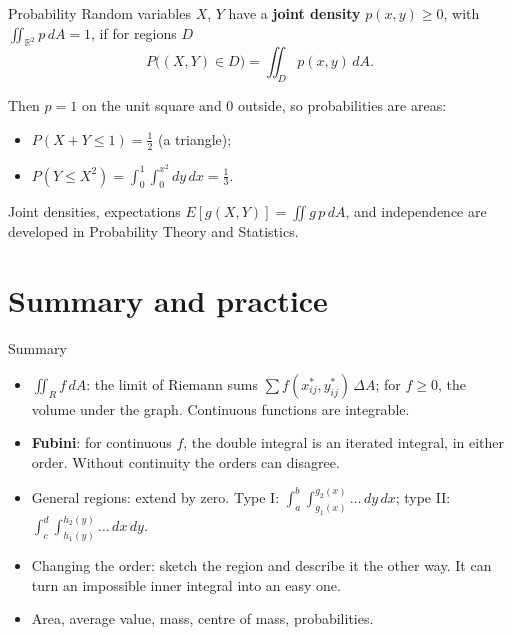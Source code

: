 \documentclass[10pt]{wosm-slides}
\newcommand{\R}{\mathbb{R}}
\newcommand{\dA}{\, dA}
\begin{document}
\begin{frame}{Probability}
  Random variables $X$, $Y$ have a \textbf{joint density} $p(x, y) \ge 0$, with
  $\iint_{\R^2} p \dA = 1$, if for regions $D$
  \[ P\bigl((X, Y) \in D\bigr) = \iint_D p(x, y) \dA . \]
  \pause
  \begin{example}
    Then $p = 1$ on the unit square and $0$ outside, so probabilities are areas:
    \begin{itemize}
      \item $P(X + Y \le 1) = \frac12$ (a triangle);
      \item $P(Y \le X^2) = \int_0^1 \int_0^{x^2} dy\, dx = \frac13$.
    \end{itemize}
  \end{example}
  \pause
  {\small Joint densities, expectations $E[g(X, Y)] = \iint g\, p \dA$, and independence are developed
  in Probability Theory and Statistics.\par}
\end{frame}

\section{Summary and practice}

\begin{frame}{Summary}
  \begin{itemize}
    \item $\iint_R f \dA$: the limit of Riemann sums $\sum f(x_{ij}^*, y_{ij}^*)\,\Delta A$; for $f \ge 0$,
      the volume under the graph. Continuous functions are integrable.
    \item \textbf{Fubini}: for continuous $f$, the double integral is an iterated integral, in
      either order. Without continuity the orders can disagree.
    \item General regions: extend by zero. Type I: $\int_a^b \int_{g_1(x)}^{g_2(x)} \dots\, dy\, dx$;
      type II: $\int_c^d \int_{h_1(y)}^{h_2(y)} \dots\, dx\, dy$.
    \item Changing the order: sketch the region and describe it the other way. It can turn an
      impossible inner integral into an easy one.
    \item Area, average value, mass, centre of mass, probabilities.
  \end{itemize}
\end{frame}
\end{document}
